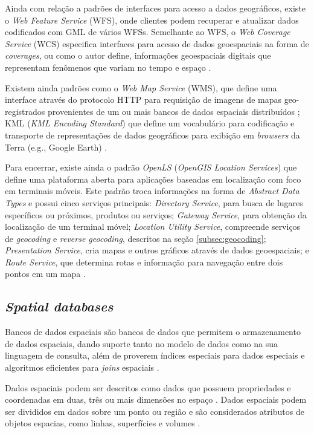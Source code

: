 \documentclass[diss]{template/setrem}
\begin{document}
Ainda com relação a padrões de interfaces para acesso a dados geográficos, existe o \emph{Web Feature Service} (WFS), onde clientes podem recuperar e atualizar dados codificados com GML de vários WFSs. Semelhante ao WFS, o \emph{Web Coverage Service} (WCS) especifica interfaces para acesso de dados geoespaciais na forma de \emph{coverages}, ou como o autor define, informações geoespaciais digitais que representam fenômenos que variam no tempo e espaço \citep{Percivall2011}.

Existem ainda padrões como o \emph{Web Map Service} (WMS), que define uma interface através do protocolo HTTP para requisição de imagens de mapas geo-registrados provenientes de um ou mais bancos de dados espaciais distribuídos \citep{OSGeo2012a}; KML (\emph{KML Encoding Standard}) que define um vocabulário para codificação e transporte de representações de dados geográficos para exibição em \emph{browsers} da Terra (e.g., Google Earth) \citep{Percivall2011}.

Para encerrar, existe ainda o padrão \emph{OpenLS} (\emph{OpenGIS Location Services}) que define uma plataforma aberta para aplicações baseadas em localização com foco em terminais móveis. Este padrão troca informações na forma de \emph{Abstract Data Types} e possui cinco serviços principais: \emph{Directory Service}, para busca de lugares específicos ou próximos, produtos ou serviços; \emph{Gateway Service}, para obtenção da localização de um terminal móvel; \emph{Location Utility Service}, compreende serviços de \emph{geocoding} e \emph{reverse geocoding}, descritos na seção \ref{subsec:geocoding}; \emph{Presentation Service}, cria mapas e outros gráficos através de dados geoespaciais; e \emph{Route Service}, que determina rotas e informação para navegação entre dois pontos em um mapa \citep{Percivall2011}.

\subsection{\textit{Spatial databases}}
\label{subsec:spatialdatabases}
Bancos de dados espaciais são bancos de dados que permitem o armazenamento de dados espaciais, dando suporte tanto no modelo de dados como na sua linguagem de consulta, além de proverem índices especiais para dados especiais e algoritmos eficientes para \emph{joins} espaciais \citep{Guting1994}.

Dados espaciais podem ser descritos como dados que possuem propriedades e coordenadas em duas, três ou mais dimensões no espaço \citep{Ooi1993}. Dados espaciais podem ser divididos em dados sobre um ponto ou região e são considerados atributos de objetos espacias, como linhas, superfícies e volumes \citep{Velicanu2010}.
\end{document}
